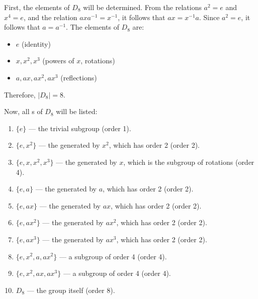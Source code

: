 \begin{enumerate}
\begin{enumerate}
\begin{subprove}
      First, the elements of \(D_{8}\) will be determined.
      From the relations \(a^{2} = e\) and \(x^{4} = e\), and the relation \(a x a^{-1} = x^{-1}\), it follows that \(a x = x^{-1} a\).
      Since \(a^{2} = e\), it follows that \(a = a^{-1}\).
      The elements of \(D_{8}\) are:
      \begin{itemize}
        \item \(e\) (identity)
        \item \(x, x^{2}, x^{3}\) (powers of \(x\), rotations)
        \item \(a, a x, a x^{2}, a x^{3}\) (reflections)
      \end{itemize}
      Therefore, \(|D_{8}| = 8\).
      
      Now, all s of \(D_{8}\) will be listed:
      \begin{enumerate}
        \item \(\{e\}\) — the trivial subgroup (order 1).
        \item \(\{e, x^{2}\}\) — the  generated by \(x^{2}\), which has order 2 (order 2).
        \item \(\{e, x, x^{2}, x^{3}\}\) — the  generated by \(x\), which is the subgroup of rotations (order 4).
        \item \(\{e, a\}\) — the  generated by \(a\), which has order 2 (order 2).
        \item \(\{e, a x\}\) — the  generated by \(a x\), which has order 2 (order 2).
        \item \(\{e, a x^{2}\}\) — the  generated by \(a x^{2}\), which has order 2 (order 2).
        \item \(\{e, a x^{3}\}\) — the  generated by \(a x^{3}\), which has order 2 (order 2).
        \item \(\{e, x^{2}, a, a x^{2}\}\) — a subgroup of order 4 (order 4).
        \item \(\{e, x^{2}, a x, a x^{3}\}\) — a subgroup of order 4 (order 4).
        \item \(D_{8}\) — the group itself (order 8).
      \end{enumerate}
      

\end{subprove}
\end{enumerate}
\end{enumerate}
